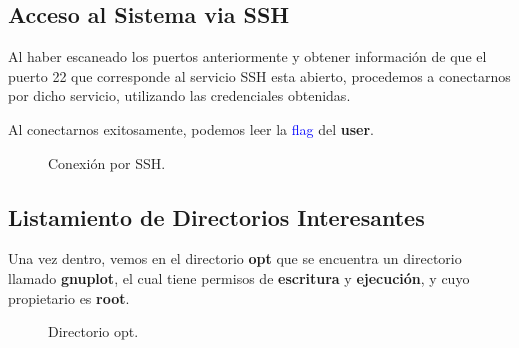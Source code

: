 \documentclass[a4paper]{article} %
\begin{document}
    \vspace{4cm}

    \subsection{Acceso al Sistema via SSH}
    
    \vspace{0.2cm}

    Al haber escaneado los puertos anteriormente y obtener información de que el puerto 22 que corresponde al servicio SSH esta abierto, procedemos a conectarnos por dicho servicio, utilizando las credenciales obtenidas.

    Al conectarnos exitosamente, podemos leer la \textcolor{blue}{flag} del \textbf{user}. 

    \begin{figure}[h] %
        \begin{center}
        \setlength{\fboxsep}{0.2em} %
        \end{center}
        \captionsetup{labelfont=bf} %
        \caption{Conexión por SSH.}
    \end{figure}

    \subsection{Listamiento de Directorios Interesantes}
    
    \vspace{0.2cm}

    Una vez dentro, vemos en el directorio \textbf{opt} que se encuentra un directorio llamado \textbf{gnuplot}, el cual tiene permisos de \textbf{escritura} y \textbf{ejecución}, y cuyo propietario es \textbf{root}.

    \begin{figure}[h] %
        \begin{center}
        \setlength{\fboxsep}{0.2em} %
        \end{center}
        \captionsetup{labelfont=bf} %
        \caption{Directorio opt.}
    \end{figure}
\end{document}
